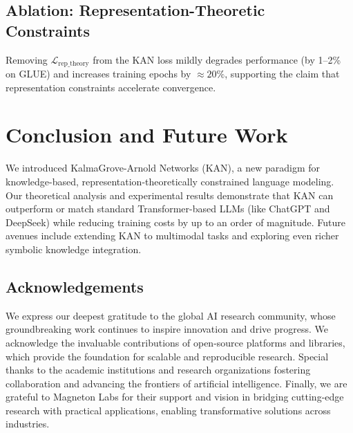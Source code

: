 \documentclass[11pt]{article}
\begin{document}
\subsection{Ablation: Representation-Theoretic Constraints}
Removing $\mathcal{L}_{\mathrm{rep\_theory}}$ from the KAN loss mildly degrades performance (by 1--2\% on GLUE) and increases training epochs by $\approx 20\%$, supporting the claim that representation constraints accelerate convergence.

\section{Conclusion and Future Work}
We introduced KalmaGrove-Arnold Networks (KAN), a new paradigm 
for knowledge-based, representation-\allowbreak theoretically 
constrained language modeling. Our theoretical analysis and 
experimental results demonstrate that KAN can outperform or 
match standard Transformer-based LLMs (like ChatGPT and DeepSeek) 
while reducing training costs by up to an order of magnitude. 
Future avenues include extending KAN to multimodal tasks 
and exploring even richer symbolic knowledge integration.

\subsection*{Acknowledgements}
We express our deepest gratitude to the global AI research community, whose groundbreaking work continues to inspire innovation and drive progress. We acknowledge the invaluable contributions of open-source platforms and libraries, which provide the foundation for scalable and reproducible research. Special thanks to the academic institutions and research organizations fostering collaboration and advancing the frontiers of artificial intelligence. Finally, we are grateful to Magneton Labs for their support and vision in bridging cutting-edge research with practical applications, enabling transformative solutions across industries.
\end{document}
